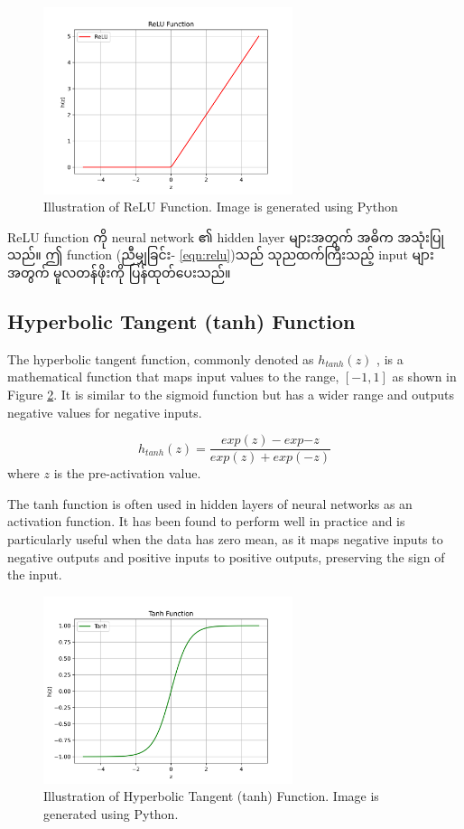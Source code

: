 \begin{figure}[h]%
\centering
\includegraphics[width=0.65\textwidth]{imgs/relu_fun.png}
\caption{Illustration of ReLU Function. Image is generated using Python}\label{fig:relu}
\end{figure}

ReLU function ကို neural network ၏ hidden layer များအတွက် အဓိက အသုံးပြုသည်။ ဤ function (ညီမျှခြင်း- \ref{eqn:relu})သည် သုညထက်ကြီးသည့် input များအတွက် မူလတန်ဖိုးကို ပြန်ထုတ်ပေးသည်။ 

\subsection{Hyperbolic Tangent (tanh) Function} 

The hyperbolic tangent function, commonly denoted as $h_{tanh}(z)$ , is a mathematical function that maps input values to the range, $[-1,1]$ as shown in Figure \ref{fig:tanh}. It is similar to the sigmoid function but has a wider range and outputs negative values for negative inputs.  

\begin{equation}\label{eqn:tanh}
    h_{tanh}(z) = \frac{exp(z) - exp{-z}}{exp(z) + exp(-z)}
\end{equation} where $z$ is the pre-activation value. 

The tanh function is often used in hidden layers of neural networks as an activation function. It has been found to perform well in practice and is particularly useful when the data has zero mean, as it maps negative inputs to negative outputs and positive inputs to positive outputs, preserving the sign of the input.

\begin{figure}[h]%
\centering
\includegraphics[width=0.65\textwidth]{imgs/tanh_fun.png}
\caption{Illustration of Hyperbolic Tangent (tanh) Function. Image is generated using Python.}\label{fig:tanh}
\end{figure}

